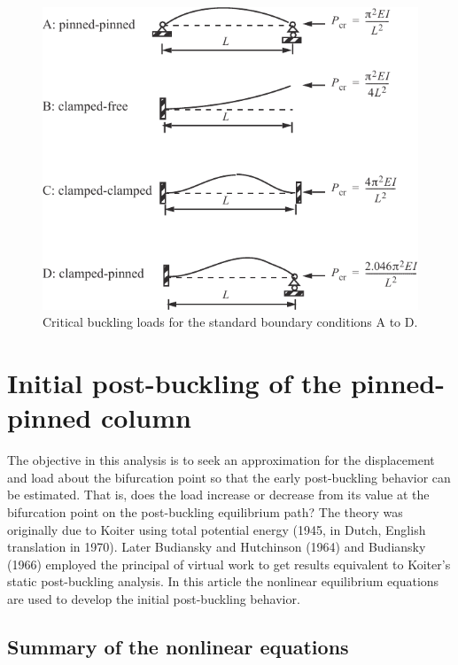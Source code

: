 \documentclass{AeroStructure-ERJohnson}
\begin{document}
\begin{figure}[!h]
\centerline{\includegraphics{Figure_11-6.pdf}}
\caption{Critical buckling loads for the standard boundary conditions A to D.} \label{fig11.6}
\vspace*{-0.8pc}
\end{figure}

\section{Initial post-buckling of the pinned-pinned column}\label{sec11.2}

The objective in this analysis is to seek an approximation for the displacement and load about the bifurcation point so that the early post-buckling behavior can be estimated. That is, does the load increase or decrease from its value at the bifurcation point on the post-buckling equilibrium path? The theory was originally due to Koiter using total potential energy (1945, in Dutch, English translation in 1970). Later Budiansky and Hutchinson (1964) and Budiansky (1966) employed the principal of virtual work to get results equivalent to Koiter's static post-buckling analysis. In this article the nonlinear equilibrium equations are used to develop the initial post-buckling behavior.

\subsection{Summary of the nonlinear equations}\label{sec11.2.1}
\end{document}
